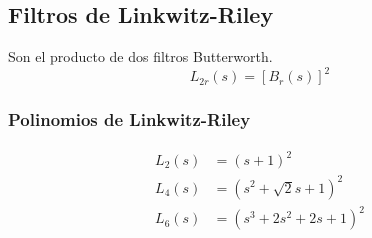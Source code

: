 \documentclass[a4paper, 8pt]{extarticle}
\begin{document}
\begin{multicols}{3}
    \subsection{Filtros de Linkwitz-Riley}

    Son el producto de dos filtros Butterworth.
    \[ L_{2r}(s) = \left[ B_r (s)\right]^2 \]

    \subsubsection{Polinomios de Linkwitz-Riley}
    \begin{align*}
        L_2 (s) & = \left( s + 1 \right)^2               \\
        L_4 (s) & = \left( s^2 + \sqrt{2}s + 1 \right)^2 \\
        L_6 (s) & = \left( s^3  +2s^ 2 +2s +1 \right)^2  \\
    \end{align*}
\end{multicols}
\end{document}
